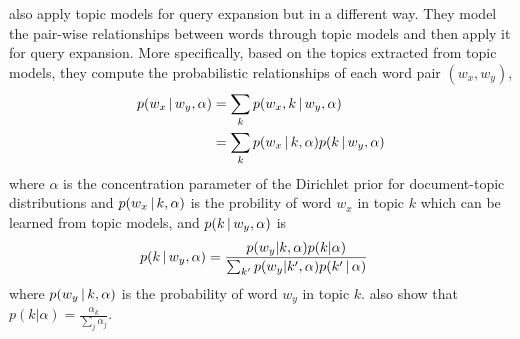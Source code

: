 \citet{Park-2009} also apply topic models for query expansion but in a
different way. They model the pair-wise relationships between words
through topic models and then apply it for query expansion. More
specifically, based on the topics extracted from topic models, they
compute the probabilistic relationships of each word pair $(w_x,
w_y)$,
\begin{align}
p(w_x \, | \, w_y, \alpha) &= \sum_k p(w_x, k  \, | \,  w_y, \alpha) \\
&= \sum_k p(w_x  \, | \,  k, \alpha) p(k  \, | \,  w_y, \alpha) \notag
\end{align}
where $\alpha$ is the concentration parameter of the Dirichlet prior
for document-topic distributions and $p(w_x  \, | \,  k, \alpha)$ is the
probility of word $w_x$ in topic $k$ which can be learned from topic models, and
$p(k  \, | \,  w_y, \alpha)$ is
\begin{align}
p(k  \, | \, w_y, \alpha) 
&= \frac{p(w_y|k,\alpha)p(k|\alpha)}{\sum_{k'} p(w_y|k',\alpha)p(k' \, | \, \alpha)} \notag
\end{align}
where $p(w_y \, | \, k,\alpha)$ is the probability of word $w_y$ in topic $k$. 
\citet{Park-2009} also show that $p(k|\alpha) = \frac{\alpha_k}{\sum_j \alpha_j}$.
